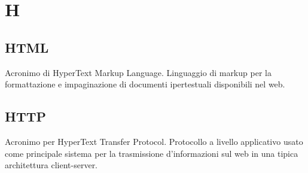 \section*{H}
\markright{}
\subsection*{HTML}
Acronimo di HyperText Markup Language. Linguaggio di markup per la formattazione e impaginazione di documenti ipertestuali disponibili nel web.
\subsection*{HTTP}
Acronimo per HyperText Transfer Protocol. Protocollo a livello applicativo usato come principale sistema per la trasmissione d'informazioni sul web in una tipica architettura client-server.